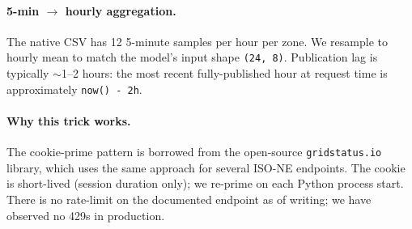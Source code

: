 \paragraph{5-min $\to$ hourly aggregation.} The native CSV has 12 5-minute samples per hour per zone. We resample to hourly mean to match the model's input shape \texttt{(24, 8)}. Publication lag is typically $\sim$1--2 hours: the most recent fully-published hour at request time is approximately \texttt{now() - 2h}.

\paragraph{Why this trick works.} The cookie-prime pattern is borrowed from the open-source \texttt{gridstatus.io} library, which uses the same approach for several ISO-NE endpoints. The cookie is short-lived (session duration only); we re-prime on each Python process start. There is no rate-limit on the documented endpoint as of writing; we have observed no 429s in production.
